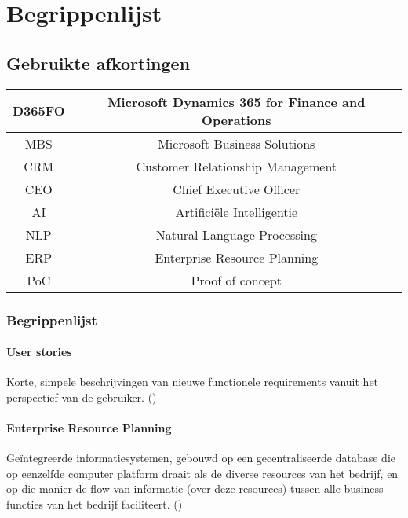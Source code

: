 \chapter{Begrippenlijst}
\label{ch:begrippenlijst}

\section{Gebruikte afkortingen}
\begin{tabular}{|c|c|}
    \hline 
    D365FO &  Microsoft Dynamics 365 for Finance and Operations \\
    \hline 
    MBS & Microsoft Business Solutions \\
    \hline
    CRM & Customer Relationship Management  \\
    \hline
    CEO & Chief Executive Officer \\
    \hline
    AI & Artificiële Intelligentie \\
    \hline
    NLP & Natural Language Processing \\
    \hline
    ERP & Enterprise Resource Planning \\
    \hline
    PoC & Proof of concept \\
    \hline 
\end{tabular} 

\subsection{Begrippenlijst}
\subsubsection{User stories}
Korte, simpele beschrijvingen van nieuwe functionele requirements vanuit het perspectief van de gebruiker. (\textcite{Cohn2004})

\subsubsection{Enterprise Resource Planning}
Geïntegreerde informatiesystemen, gebouwd op een gecentraliseerde database die op eenzelfde computer platform draait als de diverse resources van het bedrijf, en op die manier de flow van informatie (over deze resources) tussen alle business functies van het bedrijf faciliteert. (\textcite{Hill2011})



